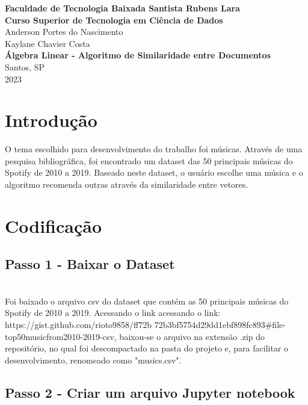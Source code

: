 \documentclass[a4paper, 12pt]{article}
\begin{document}
\begin{center}
    \large
    \textbf{Faculdade de Tecnologia Baixada Santista Rubens Lara\\}
    \textbf{Curso Superior de Tecnologia em Ciência de Dados}
    \vspace{6.5cm}\\
    Anderson Portes do Nascimento\\Kaylane Chavier Costa\\
    \vspace{6cm}
    \textbf{Álgebra Linear - Algoritmo de Similaridade entre Documentos}
    \\
    \vspace{6cm}
    Santos, SP\\
    2023
\end{center}

\newpage
    \onehalfspacing
    \section{Introdução}
    
    \par O tema escolhido para desenvolvimento do trabalho foi músicas. Através de uma pesquisa bibliográfica, foi encontrado um dataset das 50 principais músicas do Spotify de 2010 a 2019. Baseado neste dataset, o usuário escolhe uma música e o algoritmo recomenda outras através da similaridade entre vetores.



\section{Codificação}

\subsection{Passo 1 - Baixar o Dataset}

\\Foi baixado o arquivo csv do dataset que contém as 50 principais músicas do Spotify de 2010 a 2019. Acessando o link acessando o link: https://gist.github.com/rioto9858/ff72b
72b3bf5754d29dd1ebf898fc893#file-top50musicfrom2010-2019-csv, baixou-se o arquivo na extensão .zip do repositório, no qual foi descompactado na pasta do projeto e, para facilitar o desenvolvimento, renomeado como "musics.csv".

\subsection{Passo 2 - Criar um arquivo Jupyter notebook}
\end{document}
